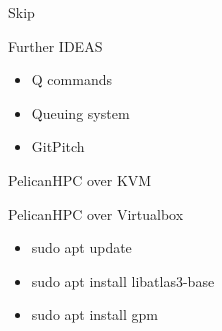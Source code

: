 \documentclass[ignorenonframetext,]{beamer}
\providecommand{\tightlist}{%
  \setlength{\itemsep}{0pt}\setlength{\parskip}{0pt}}
\begin{document}
\begin{frame}{Skip}

\begin{block}{Further IDEAS}

\begin{itemize}
\item
  Q commands
\item
  Queuing system
\item
  GitPitch
\end{itemize}

\end{block}

\end{frame}

\begin{frame}{PelicanHPC over KVM}

\end{frame}

\begin{frame}{PelicanHPC over Virtualbox}


\begin{itemize}
\tightlist
\item
  sudo apt update
\item
  sudo apt install libatlas3-base
\item
  sudo apt install gpm
\end{itemize}


\end{frame}
\end{document}
